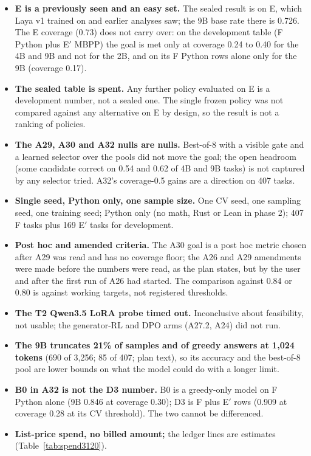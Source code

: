 \documentclass[11pt,a4paper]{article}
\begin{document}
\begin{itemize}
\item \textbf{E is a previously seen and an easy set.} The sealed result is on E, which Laya v1 trained on and earlier analyses saw; the 9B base rate there is 0.726. The E coverage (0.73) does not carry over: on the development table (F Python plus E$'$ MBPP) the goal is met only at coverage 0.24 to 0.40 for the 4B and 9B and not for the 2B, and on its F Python rows alone only for the 9B (coverage 0.17).
\item \textbf{The sealed table is spent.} Any further policy evaluated on E is a development number, not a sealed one. The single frozen policy was not compared against any alternative on E by design, so the result is not a ranking of policies.
\item \textbf{The A29, A30 and A32 nulls are nulls.} Best-of-8 with a visible gate and a learned selector over the pools did not move the goal; the open headroom (some candidate correct on 0.54 and 0.62 of 4B and 9B tasks) is not captured by any selector tried. A32's coverage-0.5 gains are a direction on 407 tasks.
\item \textbf{Single seed, Python only, one sample size.} One CV seed, one sampling seed, one training seed; Python only (no math, Rust or Lean in phase 2); 407 F tasks plus 169 E$'$ tasks for development.
\item \textbf{Post hoc and amended criteria.} The A30 goal is a post hoc metric chosen after A29 was read and has no coverage floor; the A26 and A29 amendments were made before the numbers were read, as the plan states, but by the user and after the first run of A26 had started. The comparison against 0.84 or 0.80 is against working targets, not registered thresholds.
\item \textbf{The T2 Qwen3.5 LoRA probe timed out.} Inconclusive about feasibility, not usable; the generator-RL and DPO arms (A27.2, A24) did not run.
\item \textbf{The 9B truncates 21\% of samples and of greedy answers at 1,024 tokens} (690 of 3,256; 85 of 407; plan text), so its accuracy and the best-of-8 pool are lower bounds on what the model could do with a longer limit.
\item \textbf{B0 in A32 is not the D3 number.} B0 is a greedy-only model on F Python alone (9B 0.846 at coverage 0.30); D3 is F plus E$'$ rows (0.909 at coverage 0.28 at its CV threshold). The two cannot be differenced.
\item \textbf{List-price spend, no billed amount;} the ledger lines are estimates (Table~\ref{tab:spend3120}).
\end{itemize}
\end{document}
